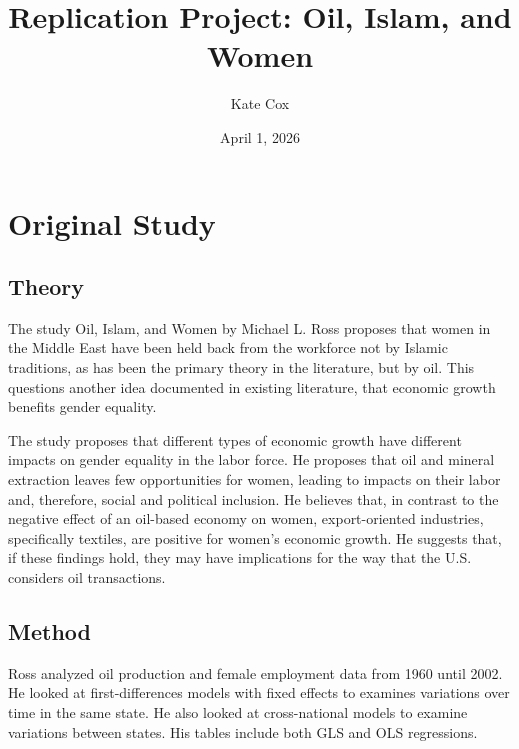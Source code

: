 \documentclass[12pt,letterpaper]{article}
\title{Replication Project: Oil, Islam, and Women}
\date{April 1, 2026}
\author{Kate Cox}
\begin{document}
	\maketitle
	\section*{Original Study}
	\vspace{.25cm}
	
	\subsection*{Theory}
	
	\vspace{.25cm}
	
	\noindent The study Oil, Islam, and Women by Michael L. Ross proposes that women in the Middle East have been held back from the workforce not by Islamic traditions, as has been the primary theory in the literature, but by oil. This questions another idea documented in existing literature, that economic growth benefits gender equality.
	
	\vspace{.5cm}
	
	\noindent The study proposes that different types of economic growth have different impacts on gender equality in the labor force. He proposes that oil and mineral extraction leaves few opportunities for women, leading to impacts on their labor and, therefore, social and political inclusion. He believes that, in contrast to the negative effect of an oil-based economy on women, export-oriented industries, specifically textiles, are positive for women's economic growth. He suggests that, if these findings hold, they may have implications for the way that the U.S. considers oil transactions. 
	
	\vspace{.5cm}
	 
	\subsection*{Method}

	\vspace{.25cm}
	
	\noindent Ross analyzed oil production and female employment data from 1960 until 2002. He looked at first-differences models with fixed effects to examines variations over time in the same state. He also looked at cross-national models to examine variations between states. His tables include both GLS and OLS regressions.
	
\end{document}
